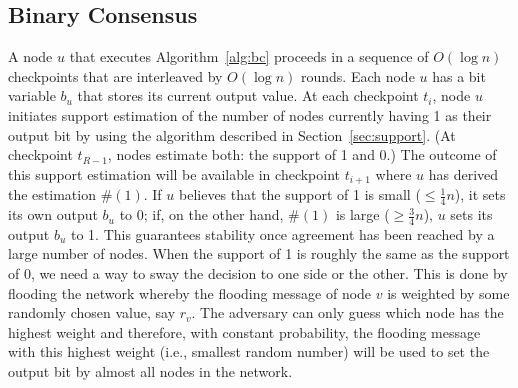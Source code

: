 \documentclass[leqno,11pt]{article}
\renewcommand{\ge}{\geqslant}
\renewcommand{\le}{\leqslant}
\newcommand{\bc}{{\sc Binary Consensus}}
\begin{document}
\subsection{\bc} \label{sec:obliviousBC}

A node $u$ that executes Algorithm~\ref{alg:bc} proceeds in a sequence of
$O(\log n)$ checkpoints that are interleaved by $O(\log n)$ rounds. Each node $u$ has a bit variable $b_u$ that stores its current output value. At each
checkpoint $t_i$, node $u$ initiates support estimation of the number of nodes
currently having 1 as their output bit by using the algorithm described in
Section~\ref{sec:support}. (At checkpoint $t_{R-1}$, nodes estimate both:
the support of 1 and 0.) 
The outcome of this support estimation will be
available in checkpoint $t_{i+1}$ where $u$ has derived the estimation $\#(1)$.
If $u$ believes that the support of 1 is small ($\le \frac{1}{4}n$), it
sets its own output $b_u$ to 0; if, on the other hand, $\#(1)$ is large ($\ge
\frac{3}{4}n$), $u$ sets its output $b_u$ to 1. This guarantees stability once
agreement has been reached by a large number of nodes. When the support of 1 is
roughly the same as the support of 0, we need a way to sway the decision to one
side or the other. This is done by flooding the network whereby the flooding
message of node $v$ is weighted by some randomly chosen value, say $r_v$. The adversary can only
guess which node has the highest weight and therefore, with constant
probability, the flooding message with this highest weight (i.e., smallest
random number) will be used to set the output bit by almost all nodes in the
network. 
\end{document}
